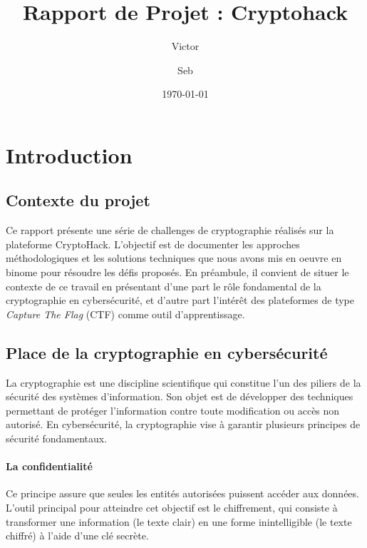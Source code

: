 \documentclass[12pt, a4paper]{article}
\title{Rapport de Projet : Cryptohack}
\author{Victor \and Seb}
\date{\today} %
\begin{document}
\maketitle

\tableofcontents

\newpage %


\section{Introduction}

\subsection{Contexte du projet}

Ce rapport présente une série de challenges de cryptographie réalisés sur la plateforme CryptoHack. L'objectif est de documenter les approches méthodologiques et les solutions techniques que nous avons mis en oeuvre en binome pour résoudre les défis proposés. En préambule, il convient de situer le contexte de ce travail en présentant d'une part le rôle fondamental de la cryptographie en cybersécurité, et d'autre part l'intérêt des plateformes de type \textit{Capture The Flag} (CTF) comme outil d'apprentissage.

\subsection{Place de la cryptographie en cybersécurité}

La cryptographie est une discipline scientifique qui constitue l'un des piliers de la sécurité des systèmes d'information. Son objet est de développer des techniques permettant de protéger l'information contre toute modification ou accès non autorisé. En cybersécurité, la cryptographie vise à garantir plusieurs principes de sécurité fondamentaux.

\paragraph{La confidentialité}
Ce principe assure que seules les entités autorisées puissent accéder aux données. L'outil principal pour atteindre cet objectif est le chiffrement, qui consiste à transformer une information (le texte clair) en une forme inintelligible (le texte chiffré) à l'aide d'une clé secrète.
\end{document}
